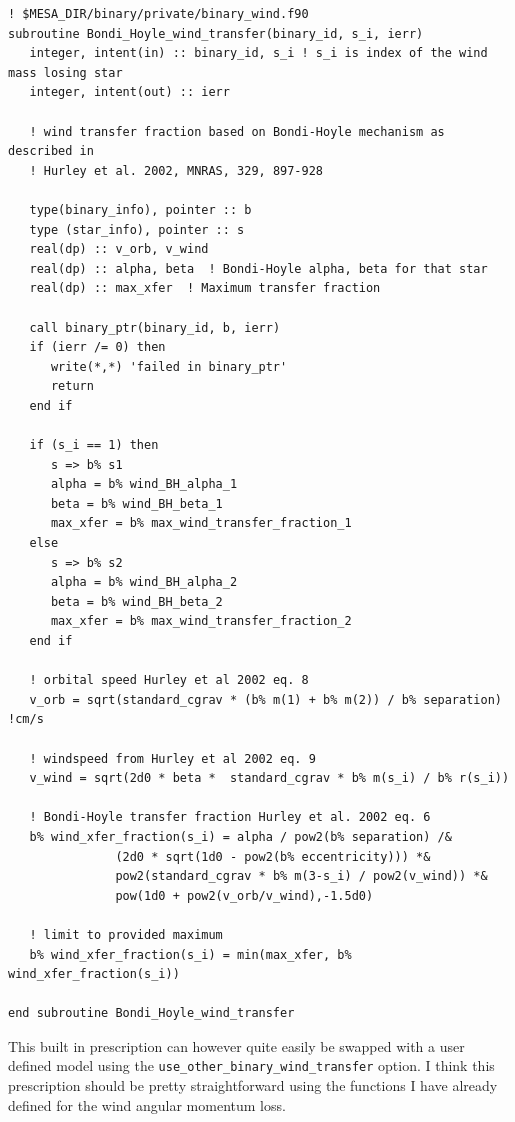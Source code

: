 \documentclass[a4paper,10pt]{article}
\begin{document}
\begin{verbatim}
! $MESA_DIR/binary/private/binary_wind.f90 
subroutine Bondi_Hoyle_wind_transfer(binary_id, s_i, ierr)
   integer, intent(in) :: binary_id, s_i ! s_i is index of the wind mass losing star
   integer, intent(out) :: ierr

   ! wind transfer fraction based on Bondi-Hoyle mechanism as described in
   ! Hurley et al. 2002, MNRAS, 329, 897-928

   type(binary_info), pointer :: b
   type (star_info), pointer :: s
   real(dp) :: v_orb, v_wind
   real(dp) :: alpha, beta  ! Bondi-Hoyle alpha, beta for that star
   real(dp) :: max_xfer  ! Maximum transfer fraction

   call binary_ptr(binary_id, b, ierr)
   if (ierr /= 0) then
      write(*,*) 'failed in binary_ptr'
      return
   end if
   
   if (s_i == 1) then
      s => b% s1
      alpha = b% wind_BH_alpha_1
      beta = b% wind_BH_beta_1
      max_xfer = b% max_wind_transfer_fraction_1
   else
      s => b% s2
      alpha = b% wind_BH_alpha_2
      beta = b% wind_BH_beta_2
      max_xfer = b% max_wind_transfer_fraction_2
   end if
   
   ! orbital speed Hurley et al 2002 eq. 8
   v_orb = sqrt(standard_cgrav * (b% m(1) + b% m(2)) / b% separation) !cm/s
   
   ! windspeed from Hurley et al 2002 eq. 9
   v_wind = sqrt(2d0 * beta *  standard_cgrav * b% m(s_i) / b% r(s_i))
   
   ! Bondi-Hoyle transfer fraction Hurley et al. 2002 eq. 6
   b% wind_xfer_fraction(s_i) = alpha / pow2(b% separation) /&
               (2d0 * sqrt(1d0 - pow2(b% eccentricity))) *&
               pow2(standard_cgrav * b% m(3-s_i) / pow2(v_wind)) *&
               pow(1d0 + pow2(v_orb/v_wind),-1.5d0)
               
   ! limit to provided maximum
   b% wind_xfer_fraction(s_i) = min(max_xfer, b% wind_xfer_fraction(s_i))
   
end subroutine Bondi_Hoyle_wind_transfer
\end{verbatim}


This built in prescription can however quite easily be swapped with a user defined model using the \lstinline[style=output, breaklines=true]|use_other_binary_wind_transfer| option. I think this prescription should be pretty straightforward using the functions I have already defined for the wind angular momentum loss.
\end{document}
